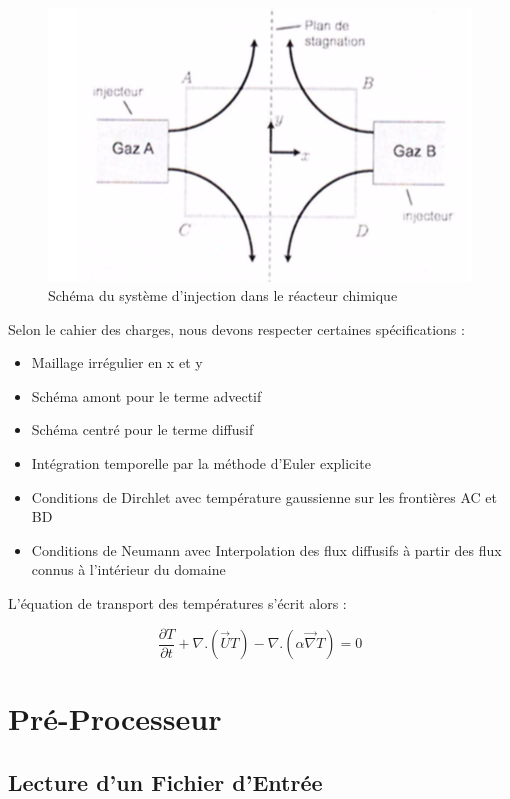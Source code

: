 \documentclass[a4paper,oneside]{article}
\makeatletter
\def\bigcenter{\trivlist \bigcentering\item\relax}
\def\bigcentering{\let\\\@centercr\rightskip\@bigflushglue%
\leftskip\@bigflushglue
\parindent\z@\parfillskip\z@skip}
\makeatother
\begin{document}
\begin{figure}[h!]
\bigcenter
\includegraphics[scale=0.8]{Schema_reacteur.PNG}
\caption{Schéma du système d'injection dans le réacteur chimique}
\end{figure}

Selon le cahier des charges, nous devons respecter certaines spécifications :
\begin{itemize}
	\item Maillage irrégulier en x et y
	\item Schéma amont pour le terme advectif
	\item Schéma centré pour le terme diffusif
	\item Intégration temporelle par la méthode d'Euler explicite
	\item Conditions de Dirchlet avec température gaussienne sur les frontières AC et BD
	\item Conditions de Neumann avec Interpolation des flux diffusifs à partir des flux connus à l'intérieur du domaine\\
\end{itemize}

L'équation de transport des températures s'écrit alors :

\begin{equation}	\label{eqderivpart}
\frac{\partial T}{\partial t} + \nabla . (\overrightarrow{U}T) - \nabla . (\alpha \overrightarrow{\nabla}T) = 0 
\end{equation}

\section{Pré-Processeur}
\subsection{Lecture d'un Fichier d'Entrée}
\end{document}
